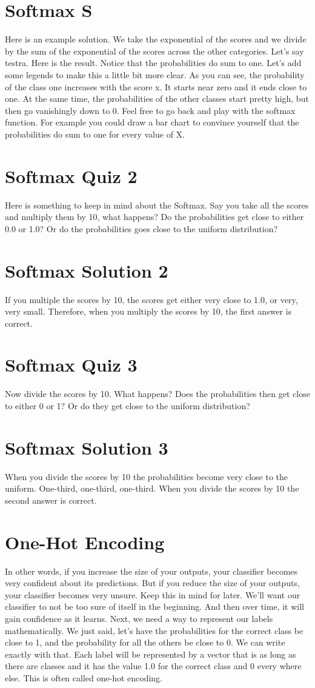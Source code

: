 \documentclass{article}
\begin{document}
\section{Softmax S}
Here is an example solution.
We take the exponential of
the scores and we divide by the sum
of the exponential of the scores
across the other categories.
Let's say testra.
Here is the result.
Notice that the probabilities
do sum to one.
Let's add some legends to make
this a little bit more clear.
As you can see, the probability of the
class one increases with the score x.
It starts near zero and
it ends close to one.
At the same time, the probabilities of
the other classes start pretty high, but
then go vanishingly down to 0.
Feel free to go back and
play with the softmax function.
For example you could draw a bar
chart to convince yourself
that the probabilities do sum to one for
every value of X.
\section{Softmax Quiz 2}
Here is something to keep
in mind about the Softmax.
Say you take all the scores and
multiply them by 10, what happens?
Do the probabilities get
close to either 0.0 or 1.0?
Or do the probabilities goes close
to the uniform distribution?
\section{Softmax Solution 2}
If you multiple the scores by 10,
the scores get either very close to 1.0,
or very, very small.
Therefore, when you multiply the scores
by 10, the first answer is correct.
\section{Softmax Quiz 3}
Now divide the scores by 10.
What happens?
Does the probabilities then
get close to either 0 or 1?
Or do they get close to
the uniform distribution?
\section{Softmax Solution 3}
When you divide the scores
by 10 the probabilities
become very close to the uniform.
One-third, one-third, one-third.
When you divide the scores by
10 the second answer is correct.
\section{One-Hot Encoding}
In other words, if you increase
the size of your outputs,
your classifier becomes very
confident about its predictions.
But if you reduce
the size of your outputs,
your classifier becomes very unsure.
Keep this in mind for later.
We'll want our classifier to not be
too sure of itself in the beginning.
And then over time,
it will gain confidence as it learns.
Next, we need a way to represent
our labels mathematically.
We just said, let's have the
probabilities for the correct class be
close to 1, and the probability for
all the others be close to 0.
We can write exactly with that.
Each label will be
represented by a vector
that is as long as there are classes and
it has the value 1.0 for the correct
class and 0 every where else.
This is often called one-hot encoding.
\end{document}
